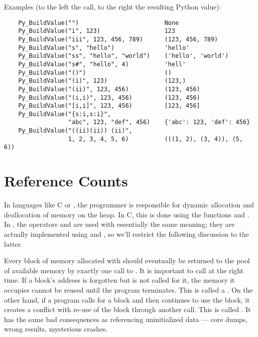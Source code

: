 Examples (to the left the call, to the right the resulting Python value):

\begin{verbatim}
    Py_BuildValue("")                        None
    Py_BuildValue("i", 123)                  123
    Py_BuildValue("iii", 123, 456, 789)      (123, 456, 789)
    Py_BuildValue("s", "hello")              'hello'
    Py_BuildValue("ss", "hello", "world")    ('hello', 'world')
    Py_BuildValue("s#", "hello", 4)          'hell'
    Py_BuildValue("()")                      ()
    Py_BuildValue("(i)", 123)                (123,)
    Py_BuildValue("(ii)", 123, 456)          (123, 456)
    Py_BuildValue("(i,i)", 123, 456)         (123, 456)
    Py_BuildValue("[i,i]", 123, 456)         [123, 456]
    Py_BuildValue("{s:i,s:i}",
                  "abc", 123, "def", 456)    {'abc': 123, 'def': 456}
    Py_BuildValue("((ii)(ii)) (ii)",
                  1, 2, 3, 4, 5, 6)          (((1, 2), (3, 4)), (5, 6))
\end{verbatim}


\section{Reference Counts
         \label{refcounts}}

In languages like C or \Cpp, the programmer is responsible for
dynamic allocation and deallocation of memory on the heap.  In C,
this is done using the functions  and
.  In \Cpp, the operators  and
 are used with essentially the same meaning; they are
actually implemented using  and
, so we'll restrict the following discussion to the
latter.

Every block of memory allocated with  should
eventually be returned to the pool of available memory by exactly one
call to .  It is important to call
 at the right time.  If a block's address is
forgotten but  is not called for it, the memory it
occupies cannot be reused until the program terminates.  This is
called a .  On the other hand, if a program calls
 for a block and then continues to use the block, it
creates a conflict with re-use of the block through another
 call.  This is called .
It has the same bad consequences as referencing uninitialized data ---
core dumps, wrong results, mysterious crashes.

